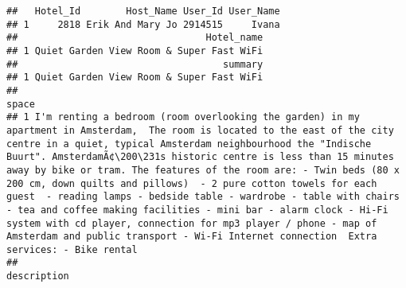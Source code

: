 \documentclass[]{article}
\begin{document}
\begin{verbatim}
##   Hotel_Id        Host_Name User_Id User_Name
## 1     2818 Erik And Mary Jo 2914515     Ivana
##                                 Hotel_name
## 1 Quiet Garden View Room & Super Fast WiFi
##                                    summary
## 1 Quiet Garden View Room & Super Fast WiFi
##                                                                                                                                                                                                                                                                                                                                                                                                                                                                                                                                                                                                                                                                                                         space
## 1 I'm renting a bedroom (room overlooking the garden) in my apartment in Amsterdam,  The room is located to the east of the city centre in a quiet, typical Amsterdam neighbourhood the "Indische Buurt". AmsterdamÃ¢\200\231s historic centre is less than 15 minutes away by bike or tram. The features of the room are: - Twin beds (80 x 200 cm, down quilts and pillows)  - 2 pure cotton towels for each guest  - reading lamps - bedside table - wardrobe - table with chairs - tea and coffee making facilities - mini bar - alarm clock - Hi-Fi system with cd player, connection for mp3 player / phone - map of Amsterdam and public transport - Wi-Fi Internet connection  Extra services: - Bike rental
##                                                                                                                                                                                                                                                                                                                                                                                                                                                                                                                                                                                                                                                                                                                                                                                                                                                                                                                                                                                                                                  description

\end{verbatim}
\end{document}
